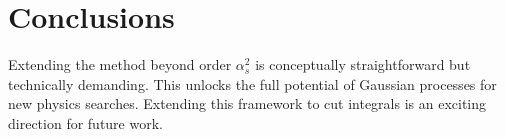 \section{Conclusions}\label{sec:conclusions}

Extending the method beyond order $\alpha_s^2$ is conceptually
straightforward but technically demanding. This unlocks the full
potential of Gaussian processes for new physics searches. Extending this
framework to cut integrals is an exciting direction for future work.

